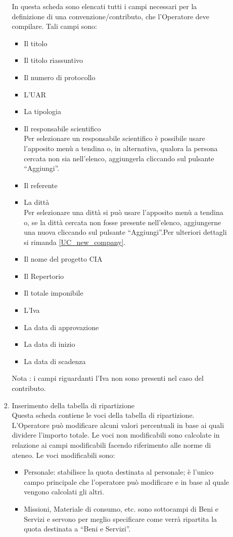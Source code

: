 \begin{enumerate}
\begin{enumerate}
\begin{enumerate}
      In questa scheda sono elencati tutti i campi necessari per la definizione di una convenzione/contributo, 
      che l'Operatore deve compilare. Tali campi sono:
      \begin{itemize}
	\item Il titolo
	\item Il titolo riassuntivo
	\item Il numero di protocollo
	\item L'UAR
	\item La tipologia
	\item Il responsabile scientifico\\
	  Per selezionare un responsabile scientifico è possibile usare l'apposito menù a tendina o, in alternativa, qualora la persona cercata non sia nell'elenco, aggiungerla cliccando sul pulsante ``Aggiungi''.
	\item Il referente
	\item La dittà\\
	  Per selezionare una dittà si può usare l'apposito menù a tendina o, se la dittà cercata non fosse presente nell'elenco, aggiungerne una nuova cliccando sul pulsante ``Aggiungi''.Per ulteriori dettagli si rimanda \ref{UC_new_company}.
	\item Il nome del progetto CIA
	\item Il Repertorio
	\item Il totale imponibile
	\item L'Iva
	\item La data di approvazione
	\item La data di inizio
	\item La data di scadenza
      \end{itemize}
      
      Nota : i campi riguardanti l'Iva non sono presenti nel caso del contributo.
      
    \item Inserimento della tabella di ripartizione\\
     
      Questa scheda contiene le voci della tabella di ripartizione. L'Operatore può modificare alcuni valori percentuali 
      in base ai quali dividere l'importo totale. Le voci non modificabili sono calcolate in relazione ai campi modificabili facendo riferimento alle norme di ateneo. Le voci modificabili sono:
      \begin{itemize}
	\item Personale: stabilisce la quota destinata al personale; è l'unico campo principale che l'operatore può modificare e in base al quale vengono calcolati gli altri.
	\item Missioni, Materiale di consumo, etc. sono sottocampi di Beni e Servizi e servono per meglio specificare come verrà ripartita la quota destinata a ``Beni e Servizi''.
      \end{itemize}
      

\end{enumerate}
\end{enumerate}
\end{enumerate}
